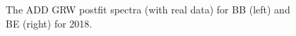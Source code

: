 \begin{figure}[!htbp]{
\caption{The ADD GRW postfit spectra (with real data) for BB (left) and BE (right) for 2018.}
\label{fig:Postfit_Real2018ADD} }
\end{figure}

